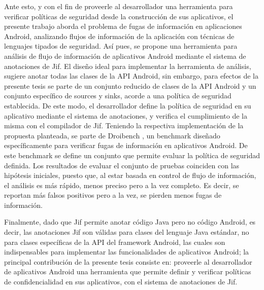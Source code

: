 Ante esto, y con el fin de proveerle al desarrollador una
herramienta para verificar políticas de seguridad desde la
construcción de sus aplicativos, el presente trabajo aborda el problema de fugas
de información en aplicaciones Android, analizando flujos de información de la
aplicación con técnicas de lenguajes tipados de seguridad.\newline 
Así pues, se propone una herramienta para análisis de flujo de información de
aplicativos Android mediante el sistema de anotaciones de Jif.\newline 
El diseño ideal para implementar la herramienta de análisis, sugiere anotar
todas las clases de la API Android, sin embargo, para efectos de la presente
tesis se parte de un conjunto reducido de clases de la API Android y un conjunto
específico de sources y sinks, acorde a una política de seguridad establecida. 
De este modo, el desarrollador define la política de seguridad en su aplicativo
mediante el sistema de anotaciones, y verifica el cumplimiento de la misma con
el compilador de Jif.\newline 
Teniendo la respectiva implementación de la propuesta planteada, se parte de
Droibench \cite{DroidBenchBenchmarks}, un benchmark diseñado específicamente
para verificar fugas de información en aplicativos Android. De este benchmark se
define un conjunto que permite evaluar la política de seguridad definida.\newline
Los resultados de evaluar el conjunto de pruebas coinciden con las hipótesis
iniciales, puesto que, al estar basada en control de flujo de información, el análisis es más rápido,
menos preciso pero a la vez completo. Es decir, se reportan más falsos positivos
pero a la vez, se pierden menos fugas de información.

Finalmente, dado que Jif permite
anotar código Java pero no código Android, es decir, las anotaciones Jif son
válidas para clases del lenguaje Java estándar, no para clases específicas de la
API del framework Android, las cuales son indispensables para
implementar las funcionalidades de aplicativos Android; la principal
contribución de la presente tesis consiste en: proveerle al desarrollador de
aplicativos Android una herramienta que permite definir y verificar políticas de
confidencialidad en sus aplicativos, con el sistema de anotaciones de
Jif.\newline


